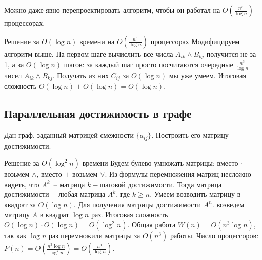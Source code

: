 Можно даже явно перепроектировать алгоритм, чтобы он работал на $O\left(\frac{n^3}{\log n}\right)$ процессорах.

\begin{algodescription}{Решение за $O(\log n)$ времени на $O\left(\frac{n^3}{\log n}\right)$ процессорах} Модифицируем алгоритм выше. На первом шаге вычислить все числа $A_{ik}\land B_{kj}$ получится не за 1, а за $O(\log n)$ шагов: за каждый шаг просто посчитаются очередные $\frac{n^3}{\log n}$ чисел $A_{ik}\land B_{kj}$. Получать из них $C_{ij}$ за $O(\log n)$ мы уже умеем. Итоговая сложность $O(\log n) + O(\log n) = O(\log n)$. 
\end{algodescription}

\subsection{Параллельная достижимость в графе}
\begin{problem*}
	Дан граф, заданный матрицей смежности $\{a_{ij}\}$. Построить его матрицу достижимости.
\end{problem*}

\begin{algodescription}{Решение за $O(\log^2 n)$ времени} Будем булево умножать матрицы: вместо $\cdot$ возьмем $\land$, вместо $+$ возьмем $\lor$. Из формулы перемножения матриц несложно видеть, что $A^k$~-- матрица $k-$шаговой достижимости. Тогда матрица достижимости~-- любая матрица $A^k$, где $k\geq n$. Умеем возводить матрицу в квадрат за $O(\log n)$. Для получения матрицы достижимости $A^n$. возведем матрицу $A$ в квадрат $\log n$ раз. Итоговая сложность $O(\log n) \cdot O(\log n) = O(\log^2 n)$. Общая работа $W(n) = O(n^3\log n)$, так как $\log n$ раз перемножили матрицы за $O(n^3)$ работы. Число процессоров: $P(n) = O\left(\frac{n^3\log n}{\log^2 n}\right) = O\left(\frac{n^3}{\log n}\right)$.
\end{algodescription}
